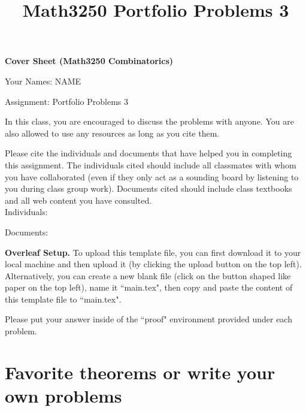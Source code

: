 \documentclass[10pt, oneside]{amsart}
\title{Math3250 Portfolio Problems 3}
\begin{document}
\begin{center}
\textbf{Cover Sheet (Math3250 Combinatorics)}
\end{center}

Your Names: NAME

\vfill 

Assignment: Portfolio Problems 3

\vfill 

\bigskip
In this class, you are encouraged to discuss the problems with anyone. You are also allowed to use any resources as long as you cite them.

Please cite the individuals and documents that have helped you in completing this assignment. 
The individuals cited should include all classmates with whom you have collaborated (even if they only act as a sounding board by listening to you during class group work).
Documents cited should include class textbooks and all web content you have consulted.
\\


Individuals:

\vfill
\vfill

Documents:

\vfill
\vfill

\newpage


\maketitle



\textbf{Overleaf Setup.}
To upload this template file, you can first download it to your local machine and then upload it (by clicking the upload button on the top left).
Alternatively, you can create a new blank file (click on the button shaped like paper on the top left), name it ``main.tex", then copy and paste the content of this template file to ``main.tex".

Please put your answer inside of the ``proof" environment provided under each problem. 

\bigskip

\tableofcontents





\section{Favorite theorems or write your own problems}
\end{document}
